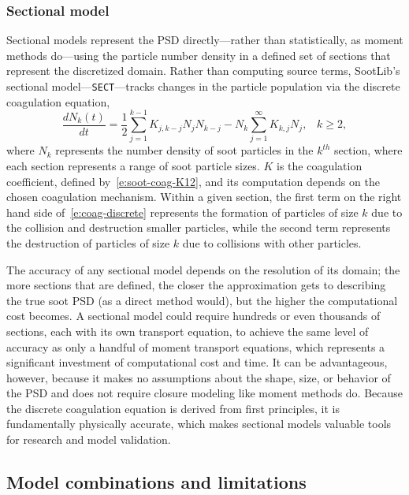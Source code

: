 \documentclass[preprint,letterpaper]{elsarticle}
\begin{document}
\subsubsection{Sectional model}
\label{s:sectional}

Sectional models represent the PSD directly---rather than statistically, as moment methods do---using the particle number density in a defined set of sections that represent the discretized domain.  Rather than computing source terms, SootLib's sectional model---\texttt{SECT}---tracks changes in the particle population via the discrete coagulation equation,
\begin{equation}
    \label{e:coag-discrete}
    \frac{dN_k(t)}{dt} = \frac{1}{2}\sum_{j=1}^{k-1}K_{j,k-j}N_jN_{k-j} - N_k \sum_{j=1}^{\infty} K_{k,j}N_j, \hspace{10pt} k \geq 2,
\end{equation}
where $N_k$ represents the number density of soot particles in the $k^{th}$ section, where each section represents a range of soot particle sizes. $K$ is the coagulation coefficient, defined by~\eqref{e:soot-coag-K12}, and its computation depends on the chosen coagulation mechanism. Within a given section, the first term on the right hand side of~\eqref{e:coag-discrete} represents the formation of particles of size $k$ due to the collision and destruction smaller particles, while the second term represents the destruction of particles of size $k$ due to collisions with other particles.

The accuracy of any sectional model depends on the resolution of its domain; the more sections that are defined, the closer the approximation gets to describing the true soot PSD (as a direct method would), but the higher the computational cost becomes. A sectional model could require hundreds or even thousands of sections, each with its own transport equation, to achieve the same level of accuracy as only a handful of moment transport equations, which represents a significant investment of computational cost and time. It can be advantageous, however, because it makes no assumptions about the shape, size, or behavior of the PSD and does not require closure modeling like moment methods do. Because the discrete coagulation equation is derived from first principles, it is fundamentally physically accurate, which makes sectional models valuable tools for research and model validation.

\subsection{Model combinations and limitations}
\label{ss:limitations}
\end{document}
